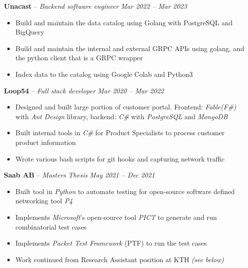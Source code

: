 \documentclass[10pt,letterpaper]{article}
\begin{document}

\headedsection
{\textbf{Unacast} -- \textit{Backend software engineer}}
{\textit{Mar 2022 -- Mar 2023}} {
	\begin{itemize}[noitemsep,nolistsep]
		\item Build and maintain the data catalog using Golang with PostgreSQL and BigQuery
		\item Build and maintain the internal and external GRPC APIs using golang, and the python client that is a GRPC wrapper
		\item Index data to the catalog using Google Colab and Python3
	\end{itemize}
	}
	\vspace{-1mm}


\headedsection
{\textbf{Loop54} -- \textit{Full stack developer}}
{\textit{Mar 2020 -- Mar 2022}} {
	\begin{itemize}[noitemsep,nolistsep]
		\item Designed and built large portion of customer portal. Frontend: \textit{Fable(F\#)} with \textit{Ant Design} library, backend: \textit{C\#} with \textit{PostgreSQL} and \textit{MongoDB}
		\item Built internal tools in \textit{C\#} for Product Specialists to process customer product information
		\item Wrote various bash scripts for git hooks and capturing network traffic
	\end{itemize}
}
\vspace{-1mm}


\headedsection
{\textbf{Saab AB} -- \textit{Masters Thesis}}
{\textit{May 2021 -- Dec 2021}} {
	\begin{itemize}[noitemsep,nolistsep]
		\item Built tool in \textit{Python} to automate testing for open-source software defined networking tool \textit{P4}
		\item Implements \textit{Microsoft}'s open-source tool \textit{PICT} to generate and run combinatorial test cases
		\item Implements \textit{Packet Test Framework} (PTF) to run the test cases
		\item Work continued from Research Assistant position at KTH \textit{(see below)}
	\end{itemize}
}
\vspace{-1mm}
\end{document}
